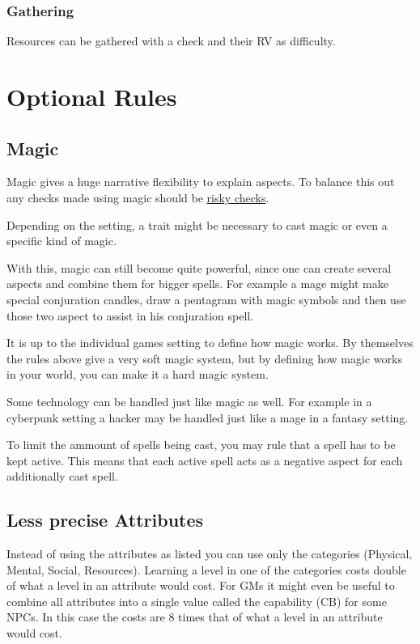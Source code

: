 \documentclass[11pt]{article}
\begin{document}
{\subsubsection{Gathering}
\label{sec:orga965f47}
Resources can be gathered with a check and their RV as difficulty.
\section{Optional Rules}
\label{sec:org1e697df}
\subsection{Magic}
\label{sec:org0e2e8bb}

Magic gives a huge narrative flexibility to explain aspects. To balance this out any checks made using magic should be \hyperref[sec:orgc05fe30]{risky checks}.

Depending on the setting, a trait might be necessary to cast magic or even a specific kind of magic.

With this, magic can still become quite powerful, since one can create several aspects and combine them for bigger spells. For example a mage might make special conjuration candles, draw a pentagram with magic symbols and then use those two aspect to assist in his conjuration spell.

It is up to the individual games setting to define how magic works. By themselves the rules above give a very soft magic system, but by defining how magic works in your world, you can make it a hard magic system.

Some technology can be handled just like magic as well. For example in a cyberpunk setting a hacker may be handled just like a mage in a fantasy setting.

To limit the ammount of spells being cast, you may rule that a spell has to be kept active. This means that each active spell acts as a negative aspect for each additionally cast spell. 
\subsection{Less precise Attributes}
\label{sec:org7891400}
Instead of using the attributes as listed you can use only the categories (Physical, Mental, Social, Resources). Learning a level in one of the categories costs double of what a level in an attribute would cost.
For GMs it might even be useful to combine all attributes into a single value called the capability (CB) for some NPCs. In this case the costs are 8 times that of what a level in an attribute would cost.
}
\end{document}
